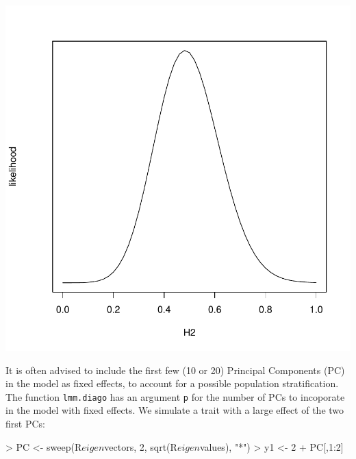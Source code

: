 \documentclass{article}
\renewenvironment{Schunk}{\vspace{\topsep}}{\vspace{\topsep}}
\begin{document}
\begin{center}
\begin{Schunk}
\end{Schunk}
\includegraphics{gaston-051}
\end{center}

  It is often advised to include the first few (10 or 20) Principal Components (PC) in the model as fixed effects,
  to account for a possible population stratification. The function \verb!lmm.diago! has an argument \verb!p!
  for the number of PCs to incoporate in the model with fixed effects. We simulate a trait with a large effect of
  the two first PCs:
\begin{Schunk}
\begin{Sinput}
> PC <- sweep(R$eigen$vectors, 2, sqrt(R$eigen$values), "*")
> y1 <- 2 + PC[,1:2] %
\end{Sinput}
\end{Schunk}
\end{document}
